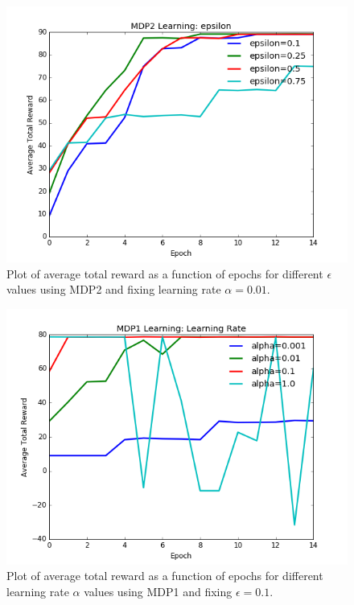 \documentclass[paper=a4, fontsize=11pt]{scrartcl}
\begin{document}
\begin{figure}
\centering
	\includegraphics[width=.8\linewidth]{mdp2_epsilon_plot.png}
\caption{Plot of average total reward as a function of epochs for different $\epsilon$ values using MDP2 and fixing learning rate $\alpha=0.01$.}
\label{fig:mdp2_epsilon}
\end{figure}

\begin{figure}
\centering
	\includegraphics[width=.8\linewidth]{mdp1_alpha_plot.png}
\caption{Plot of average total reward as a function of epochs for different learning rate $\alpha$ values using MDP1 and fixing $\epsilon=0.1$.}
\label{fig:mdp1_alpha}
\end{figure}
\end{document}
